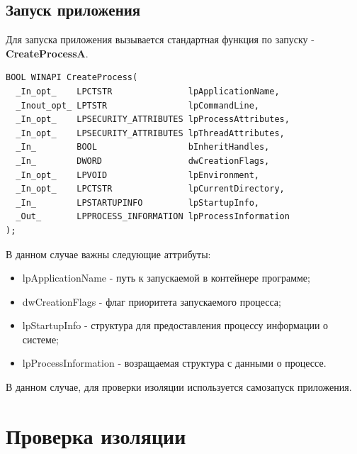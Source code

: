 \subsection{Запуск приложения}
Для запуска приложения вызывается стандартная функция по запуску - \textbf{CreateProcessA}\cite{CreateProcess}.
\begin{lstlisting}[language={}, caption={Прототип CreateProcessA}]
BOOL WINAPI CreateProcess(
  _In_opt_    LPCTSTR               lpApplicationName,
  _Inout_opt_ LPTSTR                lpCommandLine,
  _In_opt_    LPSECURITY_ATTRIBUTES lpProcessAttributes,
  _In_opt_    LPSECURITY_ATTRIBUTES lpThreadAttributes,
  _In_        BOOL                  bInheritHandles,
  _In_        DWORD                 dwCreationFlags,
  _In_opt_    LPVOID                lpEnvironment,
  _In_opt_    LPCTSTR               lpCurrentDirectory,
  _In_        LPSTARTUPINFO         lpStartupInfo,
  _Out_       LPPROCESS_INFORMATION lpProcessInformation
);
\end{lstlisting}
В данном случае важны следующие аттрибуты:
\begin{itemize}
\item lpApplicationName - путь к запускаемой в контейнере программе;
\item dwCreationFlags - флаг приоритета запускаемого процесса;
\item lpStartupInfo - структура для предоставления процессу информации о системе;
\item lpProcessInformation - возращаемая структура с данными о процессе.
\end{itemize}

В данном случае, для проверки изоляции используется самозапуск приложения.

\section{Проверка изоляции}
